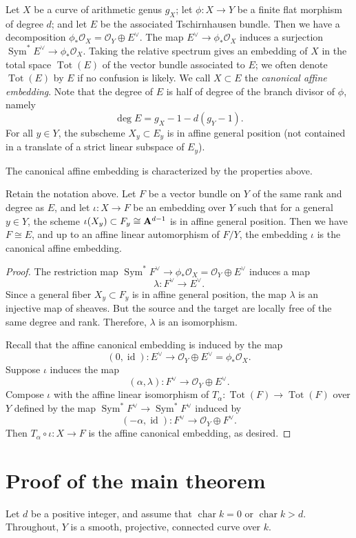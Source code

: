 \documentclass[11 pt]{amsart}
\renewcommand{\k}{k}
\DeclareMathOperator{\Tot}{Tot}
\DeclareMathOperator{\id}{id}
\renewcommand{\O}{{\mathcal O}}
\newcommand{\charac}{\operatorname{char}}
\providecommand {\A}{{\bf A}}
\providecommand {\from}{{\colon}}
\providecommand{\Sym}{\operatorname{Sym}}
\numberwithin{equation}{section}
\begin{document}
Let $X$ be a curve of arithmetic genus $g_X$; let $\phi \from X \to Y$ be a finite flat morphism of degree $d$; and let $E$ be the associated Tschirnhausen bundle.
Then we have a decomposition $\phi_* \O_X = \O_Y \oplus E^\vee$.
The map $E^\vee \to \phi_* \O_X$ induces a surjection $\Sym^* E^\vee \to \phi_* \O_X$.
Taking the relative spectrum gives an embedding of $X$ in the total space $\Tot(E)$ of the vector bundle associated to $E$; we often denote $\Tot(E)$ by $E$ if no confusion is likely.
We call $X \subset E$ the \emph{canonical affine embedding}.
Note that the degree of $E$ is half of degree of the branch divisor of $\phi$, namely
\[ \deg E = g_X - 1 - d(g_Y-1).\]
For all $y \in Y$, the subscheme $X_y \subset E_y$ is in affine general position (not contained in a translate of a strict linear subspace of $E_y$).

The canonical affine embedding is characterized by the properties above.
\begin{proposition}\label{lem:can}
  Retain the notation above.
  Let $F$ be a vector bundle on $Y$ of the same rank and degree as $E$, and let $\iota \from X \to F$ be an embedding over $Y$ such that for a general $y \in Y$, the scheme $\iota(X_y) \subset F_y \cong \A^{d-1}$ is in affine general position.
  Then we have $F \cong E$, and up to an affine linear automorphism of $F / Y$, the embedding $\iota$ is the canonical affine embedding.
\end{proposition}
\begin{proof}
  The restriction map $\Sym^* F^\vee \to \phi_*\O_X = \O_Y \oplus E^\vee$ induces a map
  \[ \lambda \from F^\vee \to E^\vee.\]
  Since a general fiber $X_y \subset F_y$ is in affine general position, the map $\lambda$ is an injective map of sheaves.
  But the source and the target are locally free of the same degree and rank.
  Therefore, $\lambda$ is an isomorphism.

  Recall that the affine canonical embedding is induced by the map
  \[(0, \id) \from E^\vee \to \O_Y \oplus E^\vee = \phi_* \O_X.\]
  Suppose $\iota$ induces the map
  \[(\alpha, \lambda) \from F^\vee \to \O_Y \oplus E^\vee.\]
  Compose $\iota$ with the affine linear isomorphism of $T_\alpha \from \Tot(F) \to \Tot(F)$ over $Y$ defined by the map $\Sym^*F^\vee \to \Sym^*F^\vee$ induced by
  \[ (-\alpha, \id) \from F^\vee \to \O_Y \oplus F^\vee.\]
  Then $T_\alpha \circ \iota \from X \to F$ is the affine canonical embedding, as desired.  
\end{proof}


\section{Proof of the main theorem}
Let $d$ be a positive integer, and assume that $\charac \k = 0$ or $\charac \k > d$.
Throughout, $Y$ is a smooth, projective, connected curve over $\k$.
\end{document}
